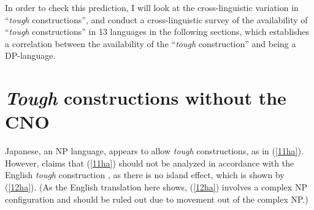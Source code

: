 \documentclass[output=paper,colorlinks,citecolor=brown,
]{langscibook}
\begin{document}
In order to check this prediction, I will look at the cross-linguistic variation in “\textit{tough} constructions”, and conduct a cross-linguistic survey of the availability of “\textit{tough} constructions” in 13 languages in the following sections, which establishes a correlation between the availability of the “\textit{tough} construction” and being a DP-language.

\section{\textit{Tough} constructions without the CNO}
Japanese, an NP language, appears to allow \textit{tough} constructions, as in (\ref{11ha}). However, \citet{takezawa1987} claims that (\ref{11ha}) should not be analyzed in accordance with the English \textit{tough} construction \citep{Chomsky1977}, as there is no island effect, which is shown by (\ref{12ha}). (As the English translation here shows, (\ref{12ha}) involves a complex NP configuration and should be ruled out due to movement out of the complex NP.) 
\end{document}
